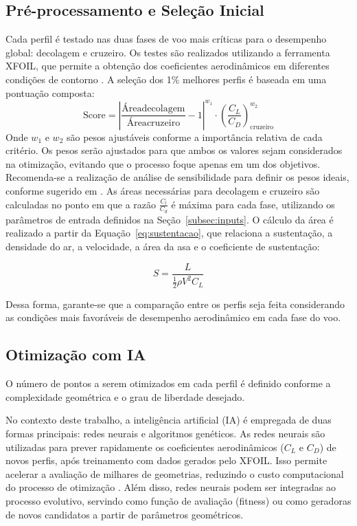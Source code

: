 \subsection{Pré-processamento e Seleção Inicial}
\label{sub:pontuacao}
Cada perfil é testado nas duas fases de voo mais críticas para o desempenho global: decolagem e cruzeiro. Os testes são realizados utilizando a ferramenta XFOIL, que permite a obtenção dos coeficientes aerodinâmicos em diferentes condições de contorno \cite{drela1989xfoil}. A seleção dos 1\% melhores perfis é baseada em uma pontuação composta:
\[
\text{Score} = \left| \frac{\text{Área}{\text{decolagem}}}{\text{Área}{\text{cruzeiro}}} - 1 \right|^{w_1} \cdot \left(\frac{C_L}{C_D}\right)_{\text{cruzeiro}}^{w_2}
\]
Onde \(w_1\) e \(w_2\) são pesos ajustáveis conforme a importância relativa de cada critério. Os pesos serão ajustados para que ambos os valores sejam considerados na otimização, evitando que o processo foque apenas em um dos objetivos. Recomenda-se a realização de análise de sensibilidade para definir os pesos ideais, conforme sugerido em \cite{oliveira2023, hasan2024}.
As áreas necessárias para decolagem e cruzeiro são calculadas no ponto em que a razão \(\frac{C_l}{C_d}\) é máxima para cada fase, utilizando os parâmetros de entrada definidos na Seção~\ref{subsec:inputs}. O cálculo da área é realizado a partir da Equação~\eqref{eq:sustentacao}, que relaciona a sustentação, a densidade do ar, a velocidade, a área da asa e o coeficiente de sustentação:

\[
 S = \frac{L}{\frac{1}{2} \rho V^2 C_L}
\]

Dessa forma, garante-se que a comparação entre os perfis seja feita considerando as condições mais favoráveis de desempenho aerodinâmico em cada fase do voo.

\subsection{Otimização com IA}
O número de pontos a serem otimizados em cada perfil é definido conforme a complexidade geométrica e o grau de liberdade desejado.

No contexto deste trabalho, a inteligência artificial (IA) é empregada de duas formas principais: redes neurais e algoritmos genéticos. As redes neurais são utilizadas para prever rapidamente os coeficientes aerodinâmicos (\(C_L\) e \(C_D\)) de novos perfis, após treinamento com dados gerados pelo XFOIL. Isso permite acelerar a avaliação de milhares de geometrias, reduzindo o custo computacional do processo de otimização \cite{wu2024, goodfellow2016deep}. Além disso, redes neurais podem ser integradas ao processo evolutivo, servindo como função de avaliação (fitness) ou como geradoras de novos candidatos a partir de parâmetros geométricos.

